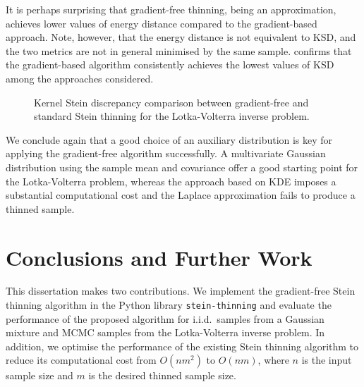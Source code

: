 \documentclass[11pt,a4paper]{report}
\begin{document}
It is perhaps surprising that gradient-free thinning, being an approximation, achieves lower values of energy distance compared to the gradient-based approach. Note, however, that the energy distance is not equivalent to KSD, and the two metrics are not in general minimised by the same sample.  confirms that the gradient-based algorithm consistently achieves the lowest values of KSD among the approaches considered.

\begin{figure}[t]
\centering
{}
\caption{Kernel Stein discrepancy comparison between gradient-free and standard Stein thinning for the Lotka-Volterra inverse problem.
\label{fig:lotka-volterra:gf-thinning:ksd}}
\end{figure}

We conclude again that a good choice of an auxiliary distribution is key for applying the gradient-free algorithm successfully. A multivariate Gaussian distribution using the sample mean and covariance offer a good starting point for the Lotka-Volterra problem, whereas the approach based on KDE imposes a substantial computational cost and the Laplace approximation fails to produce a thinned sample.

\chapter{Conclusions and Further Work}
\label{ch:conclusions}

This dissertation makes two contributions. We implement the gradient-free Stein thinning algorithm in the Python library \texttt{stein-thinning} and evaluate the performance of the proposed algorithm for i.i.d.\ samples from a Gaussian mixture and MCMC samples from the Lotka-Volterra inverse problem. In addition, we optimise the performance of the existing Stein thinning algorithm to reduce its computational cost from $O(nm^2)$ to $O(nm)$, where $n$ is the input sample size and $m$ is the desired thinned sample size.
\end{document}
